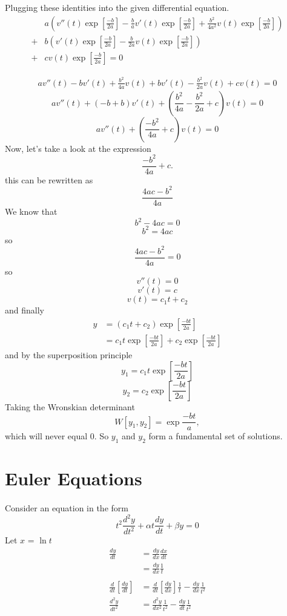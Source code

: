 \documentclass[font =22]{report}
\begin{document}
Plugging these identities into the given differential equation.
\begin{align*}
&a \left(     v''(t)\exp\left[\frac{-b}{2a}\right] -\frac{b}{a}v'(t)\exp\left[\frac{-b}{2a}\right]  +\frac{b^2}{4a^2}v(t)\exp\left[\frac{-b}{2a}\right]   \right)\\
 + &b \left(  v'(t)\exp\left[\frac{-b}{2a}\right] -\frac{b}{2a}v(t)\exp\left[\frac{-b}{2a}\right] \right)\\
  + &cv(t)\exp\left[\frac{-b}{2a}\right]= 0
  \end{align*}

\begin{align*}
    av''(t)-bv'(t) +\frac{b^2}{4a}v(t) + bv'(t)-\frac{b^2}{2a}v(t) + cv(t) = 0  
\end{align*}
\[
av''(t) +(-b+b)v'(t) + \left(   \frac{b^2}{4a} - \frac{b^2}{2a} + c  \right)v(t) = 0
\]
\[
av''(t) +\left(	\frac{-b^2}{4a} + c	\right)v(t) = 0
\]
Now, let's take a look at the expression 
\[
\frac{-b^2}{4a} + c.
\]
this can be rewritten as 
\[
\frac{4ac-b^2}{4a}
\]
We know that 
\[
b^2-4ac = 0
\]
\[
b^2 = 4ac
\]
so 
\[
\frac{4ac-b^2}{4a} = 0
\]
so 
\[
v''(t) = 0
\]
\[
v'(t) = c
\]
\[
v(t) = c_1t+c_2
\]
and finally 
\begin{align*}
y &= \left(  c_1t +c_2 \right)\exp\left[	\frac{-bt}{2a}	\right]\\
&= c_1t\exp\left[	\frac{-bt}{2a}	\right] + c_2\exp\left[	\frac{-bt}{2a}	\right]
\end{align*}
and by the superposition principle 
\[
y_1 =  c_1t\exp\left[	\frac{-bt}{2a}	\right]
\]
\[
y_2 = c_2\exp\left[	\frac{-bt}{2a}	\right]
\]
Taking the Wronskian determinant 
\[
W[y_1,y_2] = \exp{\frac{-bt}{a}},
\]
which will never equal 0. So 
$y_1$ and $y_2$ form a fundamental set of solutions.


\section{Euler Equations}
\paragraph{}
Consider an equation in the form 
\[
t^2 \frac{d^2y}{dt^2} + \alpha t\frac{dy}{dt} + \beta y = 0
\]
Let $x$ = $\ln t$ 
\begin{align*}
\frac{dy}{dt} &= \frac{dy}{dx} \frac{dx}{dt}\\
&= \frac{dy}{dx}\frac{1}{t}\\\\
\frac{d}{dt}\left[\frac{dy}{dt}\right] 
&= \frac{d}{dt}\left[\frac{dy}{dx}\right]\frac{1}{t}-\frac{dy}{dx}\frac{1}{t^2}\\
\frac{d^2y}{dt^2}&= \frac{d^2y}{dx^2}\frac{1}{t^2}- \frac{dy}{dt}\frac{1}{t^2}
\end{align*}
\end{document}
